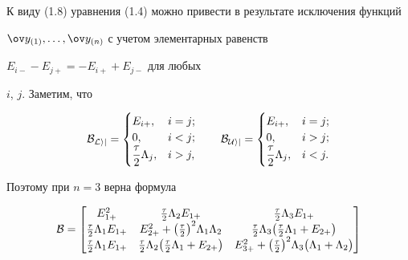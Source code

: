 \begin{pf}
К виду (1.8) уравнения (1.4) можно привести в результате исключения функций 


$\ov y_{(1)},\dotsc,\ov y_{(n)}$ с учетом элементарных равенств


$E_{i-}-E_{j+}=-E_{i+}+E_{j-}$ для любых


$i$, $j$. Заметим, что


$$


\cal B_{Lij}=\begin{cases}


E_{i+},& i=j;\\


0,& i<j;\\


\dfrac{\tau}{2}\Lambda_j,& i>j,


\end{cases} \qquad


\cal B_{Uij}=\begin{cases}


E_{i+},& i=j;\\


0,& i>j;\\


\dfrac{\tau}{2}\Lambda_j,& i<j.


\end{cases}


$$


Поэтому при $n=3$ верна формула


\begin{equation}


\cal B=


\begin{bmatrix}


E_{1+}^2 & \frac{\tau}{2}\Lambda_2E_{1+} &  \frac{\tau}{2}\Lambda_3E_{1+}\\


\frac{\tau}{2}\Lambda_1E_{1+} &


E_{2+}^2+\big(\frac{\tau}{2}\big)^2\Lambda_1\Lambda_2 & 


\frac{\tau}{2}\Lambda_3\big(\frac{\tau}{2}\Lambda_1+E_{2+}\big) \\


\frac{\tau}{2}\Lambda_1E_{1+} &


\frac{\tau}{2}\Lambda_2\big(\frac{\tau}{2}\Lambda_1+E_{2+}\big) & 


E_{3+}^2+\big(\frac{\tau}{2}\big)^2\Lambda_3\big(\Lambda_1+\Lambda_2\big)


\end{bmatrix}



\end{equation}
\end{pf}

